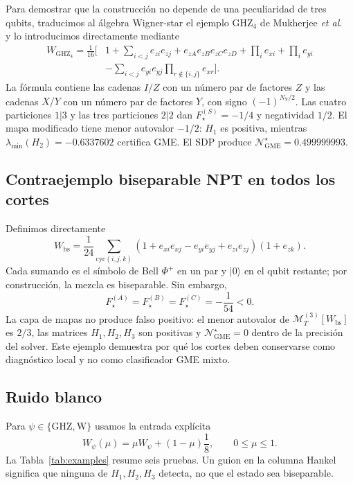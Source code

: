 \documentclass[11pt,a4paper]{article}
\newcommand{\Fstar}{F_{\star}}
\newcommand{\Ngstar}{\mathcal N_{\mathrm{GME}}^{\star}}
\theoremstyle{definition}
\begin{document}
Para demostrar que la construcción no depende de una peculiaridad de tres
qubits, traducimos al álgebra Wigner-star el ejemplo GHZ$_4$ de
Mukherjee \emph{et al.}~\cite{Mukherjee2025GMEMoments} y lo introducimos
directamente mediante
\begin{align}
 W_{\mathrm{GHZ}_4}=\frac1{16}\bigg[&1+\sum_{i<j}e_{zi}e_{zj}
 +e_{zA}e_{zB}e_{zC}e_{zD}+\prod_i e_{xi}+\prod_i e_{yi}\nonumber\\
 &-\sum_{i<j}e_{yi}e_{yj}\!\prod_{r\notin\{i,j\}}e_{xr}\bigg].
 \label{eq:W-GHZ4}
\end{align}
La fórmula contiene las cadenas $I/Z$ con un número par de factores $Z$ y las
cadenas $X/Y$ con un número par de factores $Y$, con signo
$(-1)^{N_Y/2}$. Las cuatro particiones $1|3$ y las tres particiones $2|2$ dan
$\Fstar^{(S)}=-1/4$ y negatividad $1/2$. El mapa modificado tiene menor
autovalor $-1/2$: $H_1$ es positiva, mientras
$\lambda_{\min}(H_2)=-0.6337602$ certifica GME. El SDP produce
$\Ngstar=0.499999993$.

\subsection{Contraejemplo biseparable NPT en todos los cortes}

Definimos directamente
\begin{equation}
 W_{\mathrm{bs}}
 =\frac1{24}\sum_{\mathrm{cyc}(i,j,k)}
 \left(1+e_{xi}e_{xj}-e_{yi}e_{yj}+e_{zi}e_{zj}\right)(1+e_{zk}).
 \label{eq:W-biseparable}
\end{equation}
Cada sumando es el símbolo de Bell $\Phi^+$ en un par y $|0\rangle$ en el
qubit restante; por construcción, la mezcla es biseparable. Sin embargo,
\begin{equation}
 \Fstar^{(A)}=\Fstar^{(B)}=\Fstar^{(C)}=-\frac1{54}<0.
\end{equation}
La capa de mapas no produce falso positivo: el menor autovalor de
$\mathcal M_T^{(3)}[W_{\mathrm{bs}}]$ es $2/3$, las matrices
$H_1,H_2,H_3$ son positivas y $\Ngstar=0$ dentro de la precisión del solver.
Este ejemplo demuestra por qué los cortes deben conservarse como diagnóstico
local y no como clasificador GME mixto.

\subsection{Ruido blanco}

Para $\psi\in\{\mathrm{GHZ},\mathrm W\}$ usamos la entrada explícita
\begin{equation}
 W_{\psi}(\mu)=\mu W_\psi+(1-\mu)\frac18,
 \qquad 0\leq\mu\leq1.
 \label{eq:white-noise-W}
\end{equation}
La Tabla~\ref{tab:examples} resume seis pruebas. Un guion en la columna Hankel
significa que ninguna de $H_1,H_2,H_3$ detecta, no que el estado sea
biseparable.
\end{document}
